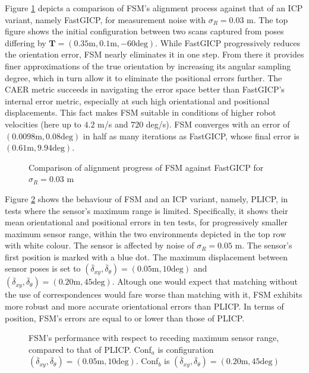 Figure \ref{fig:char_fsm_vs_FGI} depicts a comparison of FSM's alignment
process against that of an ICP variant, namely FastGICP, for measurement noise
with $\sigma_R = 0.03$ m. The top figure shows the initial configuration
between two scans captured from poses differing by $\bm{T} = (0.35 \text{m},
0.1 \text{m}, -60 \text{deg})$. While FastGICP progressively reduces the
orientation error, FSM nearly eliminates it in one step. From there it provides
finer approximations of the true orientation by increasing its angular sampling
degree, which in turn allow it to eliminate the positional errors further. The
CAER metric succeeds in navigating the error space better than FastGICP's
internal error metric, especially at such high orientational and positional
displacements. This fact makes FSM suitable in conditions of higher robot
velocities (here up to $4.2$ m/s and $720$ deg/s). FSM converges with an error
of $(0.0098 \text{m}, 0.08 \text{deg})$ in half as many iterations as FastGICP,
whose final error is $(0.61 \text{m}, 9.94 \text{deg})$.

\begin{figure}
    \vspace{0.2cm}
    
    \caption{\small Comparison of alignment progress of FSM against FastGICP
             for $\sigma_R = 0.03$ m}%
    \label{fig:char_fsm_vs_FGI}%
\end{figure}

Figure \ref{fig:char_max_range_test} shows the behaviour of FSM and an ICP
variant, namely, PLICP, in tests where the sensor's maximum range is limited.
Specifically, it shows their mean orientational and positional errors in ten
tests, for progressively smaller maximum sensor range, within the two
environments depicted in the top row with white colour. The sensor is affected
by noise of $\sigma_R = 0.05$ m. The sensor's first position is marked with a
blue dot. The maximum displacement between sensor poses is set to
$(\overline{\delta}_{xy}, \overline{\delta}_{\theta}) = (0.05 \text{m}, 10 \text{deg})$
and
$(\overline{\delta}_{xy}, \overline{\delta}_{\theta}) = (0.20 \text{m}, 45 \text{deg})$.
Altough one would expect that matching without the use of correspondences would
fare worse than matching with it, FSM exhibits more robust and more accurate
orientational errors than PLICP. In terms of position, FSM's errors are equal to
or lower than those of PLICP.


\begin{figure}\centering
\vspace{-0.2cm}
    
    \vspace{-1.5cm}
    \caption{\small FSM's performance with respect to receding maximum sensor
             range, compared to that of PLICP. Conf$_a$ is configuration
             $(\overline{\delta}_{xy}, \overline{\delta}_{\theta}) = (0.05 \text{m}, 10 \text{deg})$.
             Conf$_b$ is
             $(\overline{\delta}_{xy}, \overline{\delta}_{\theta}) = (0.20 \text{m}, 45 \text{deg})$
             }%
    \label{fig:char_max_range_test}%
\end{figure}
